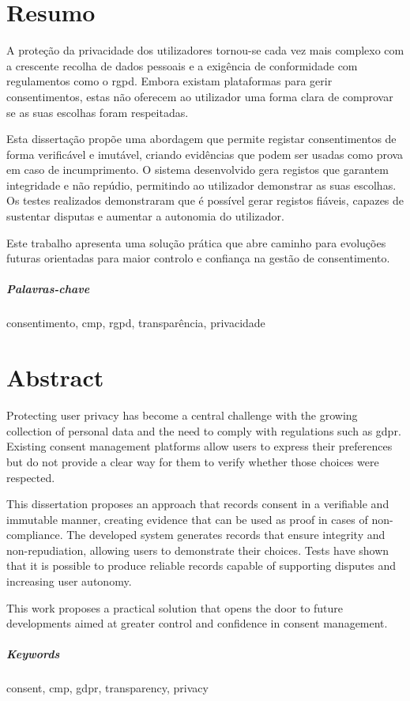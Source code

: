 \chapter*{Resumo}


A proteção da privacidade dos utilizadores tornou-se cada vez mais complexo com a crescente recolha de dados pessoais e a exigência de conformidade com regulamentos como o \acrfull{rgpd}.
Embora existam plataformas para gerir consentimentos, estas não oferecem ao utilizador uma forma clara de comprovar se as suas escolhas foram respeitadas.

Esta dissertação propõe uma abordagem que permite registar consentimentos de forma verificável e imutável, criando evidências que podem ser usadas como prova em caso de incumprimento.
O sistema desenvolvido gera registos que garantem integridade e não repúdio, permitindo ao utilizador demonstrar as suas escolhas.
Os testes realizados demonstraram que é possível gerar registos fiáveis, capazes de sustentar disputas e aumentar a autonomia do utilizador.

Este trabalho apresenta uma solução prática que abre caminho para evoluções futuras orientadas para maior controlo e confiança na gestão de consentimento.

\paragraph{Palavras-chave} consentimento, \acrshort{cmp}, \acrshort{rgpd}, transparência, privacidade

\cleardoublepage

\chapter*{Abstract}

Protecting user privacy has become a central challenge with the growing collection of personal data and the need to comply with regulations such as \acrfull{gdpr}.
Existing consent management platforms allow users to express their preferences but do not provide a clear way for them to verify whether those choices were respected.

This dissertation proposes an approach that records consent in a verifiable and immutable manner, creating evidence that can be used as proof in cases of non-compliance.
The developed system generates records that ensure integrity and non-repudiation, allowing users to demonstrate their choices.
Tests have shown that it is possible to produce reliable records capable of supporting disputes and increasing user autonomy.

This work proposes a practical solution that opens the door to future developments aimed at greater control and confidence in consent management.

\paragraph{Keywords} consent, \acrshort{cmp}, \acrshort{gdpr}, transparency, privacy
\cleardoublepage
